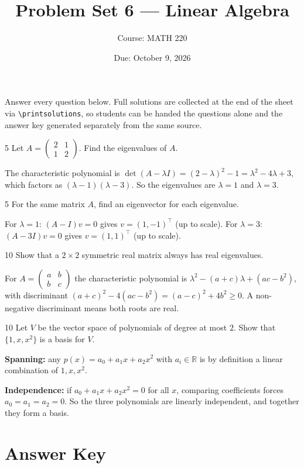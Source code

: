 \documentclass[11pt]{article}
\title{Problem Set 6 --- Linear Algebra}
\author{Course: MATH 220}
\date{Due: October 9, 2026}
\begin{document}
\maketitle

Answer every question below. Full solutions are collected at the end of the
sheet via \verb|\printsolutions|, so students can be handed the questions
alone and the answer key generated separately from the same source.

\begin{question}{5}
  Let $A = \begin{pmatrix} 2 & 1 \\ 1 & 2 \end{pmatrix}$. Find the eigenvalues
  of $A$.
\end{question}
\begin{solution}
  The characteristic polynomial is
  $\det(A - \lambda I) = (2-\lambda)^2 - 1 = \lambda^2 - 4\lambda + 3$, which
  factors as $(\lambda - 1)(\lambda - 3)$. So the eigenvalues are
  $\lambda = 1$ and $\lambda = 3$.
\end{solution}

\begin{question}{5}
  For the same matrix $A$, find an eigenvector for each eigenvalue.
\end{question}
\begin{solution}
  For $\lambda = 1$: $(A - I)v = 0$ gives $v = (1, -1)^\top$ (up to scale).
  For $\lambda = 3$: $(A - 3I)v = 0$ gives $v = (1, 1)^\top$ (up to scale).
\end{solution}

\begin{question}{10}
  Show that a $2 \times 2$ symmetric real matrix always has real eigenvalues.
\end{question}
\begin{solution}
  For $A = \begin{pmatrix} a & b \\ b & c \end{pmatrix}$ the characteristic
  polynomial is $\lambda^2 - (a+c)\lambda + (ac - b^2)$, with discriminant
  $(a+c)^2 - 4(ac - b^2) = (a - c)^2 + 4b^2 \geq 0$. A non-negative
  discriminant means both roots are real.
\end{solution}

\begin{question}{10}
  Let $V$ be the vector space of polynomials of degree at most $2$. Show that
  $\{1, x, x^2\}$ is a basis for $V$.
\end{question}
\begin{solution}
  \textbf{Spanning:} any $p(x) = a_0 + a_1 x + a_2 x^2$ with $a_i \in
  \mathbb{R}$ is by definition a linear combination of $1, x, x^2$.

  \textbf{Independence:} if $a_0 + a_1 x + a_2 x^2 = 0$ for all $x$, comparing
  coefficients forces $a_0 = a_1 = a_2 = 0$. So the three polynomials are
  linearly independent, and together they form a basis.
\end{solution}

\clearpage
\section*{Answer Key}
\printsolutions
\end{document}
